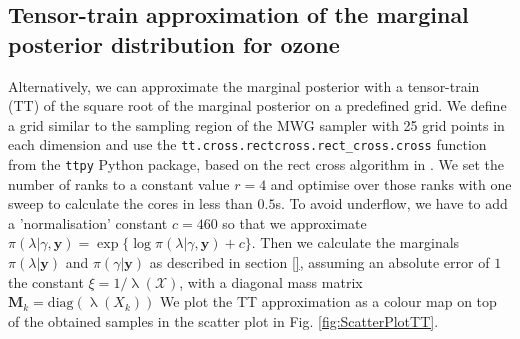 \subsection{Tensor-train approximation of the marginal posterior distribution for ozone}
\label{sec:firstMargTT}
Alternatively, we can approximate the marginal posterior with a tensor-train (TT) of the square root of the marginal posterior on a predefined grid.
We define a grid similar to the sampling region of the MWG sampler with 25 grid points in each dimension and use the \texttt{tt.cross.rectcross.rect\_cross.cross} function from the \texttt{ttpy} Python package, based on the rect cross algorithm in \cite{}.
We set the number of ranks to a constant value $r = 4$ and optimise over those ranks with one sweep to calculate the cores in less than $0.5$s.
To avoid underflow, we have to add a 'normalisation' constant $c = 460$ so that we approximate $\pi(\lambda | \gamma ,\bm{y}) = \exp\{ \log{\pi(\lambda | \gamma, \bm{y})} + c\}$.
Then we calculate the marginals $\pi(\lambda| \bm{y})$ and $\pi(\gamma| \bm{y})$ as described in section \ref{}, assuming an absolute error of $1$ the constant $\xi = 1/ \uplambda(\mathcal{X}) $, with a diagonal mass matrix $\bm{M}_k=  \text{diag}(\uplambda(X_k))$
We plot the TT approximation as a colour map on top of the obtained samples in the scatter plot in Fig. \ref{fig:ScatterPlotTT}.

